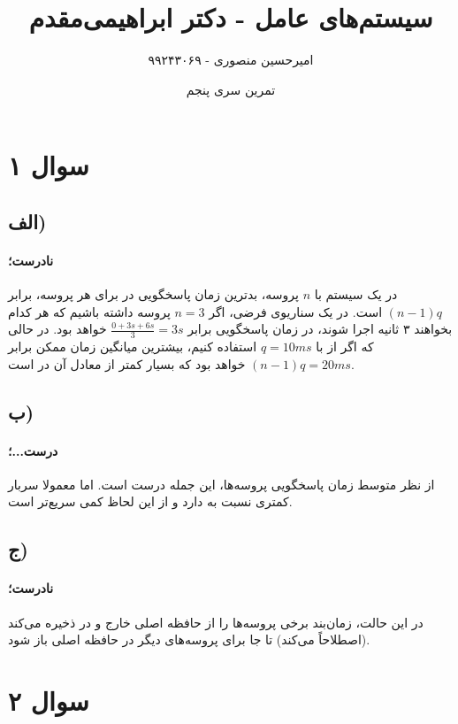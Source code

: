 \documentclass{article}
\title{سیستم‌های عامل - دکتر ابراهیمی‌مقدم}
\author{امیرحسین منصوری - ۹۹۲۴۳۰۶۹}
\date{تمرین سری پنجم}
\begin{document}
	\maketitle

	\section*{سوال ۱}
	\subsection*{الف)}
	\paragraph*{نادرست؛}
	در یک سیستم با
	$n$
	پروسه، بدترین زمان پاسخگویی در
	برای هر پروسه، برابر
	$(n-1)q$
	است. در یک سناریوی فرضی، اگر
	$n=3$
	 پروسه داشته باشیم که هر کدام بخواهند ۳ ثانیه اجرا شوند، در
	زمان پاسخگویی برابر
	$\frac{0 + 3s + 6s}{3} = 3s$
	خواهد بود. در حالی که اگر از
	با
	$q=10ms$
	استفاده کنیم، بیشترین میانگین زمان ممکن برابر
	$(n-1)q = 20ms$
	خواهد بود که بسیار کمتر از معادل آن در
	است.

	\subsection*{ب)}
	\paragraph*{درست...؛}
	از نظر متوسط زمان پاسخگویی پروسه‌ها، این جمله درست است. اما معمولا
	سربار کمتری نسبت به
	دارد و از این لحاظ کمی سریع‌تر است.

	\subsection*{ج)}
	\paragraph*{نادرست؛}
	در این حالت، زمان‌بند برخی پروسه‌ها را از حافظه اصلی خارج و در
	ذخیره می‌کند (اصطلاحاً
	می‌کند) تا جا برای پروسه‌های دیگر در حافظه اصلی باز شود.

	\section*{سوال ۲}
	\subsection*{}
\end{document}
